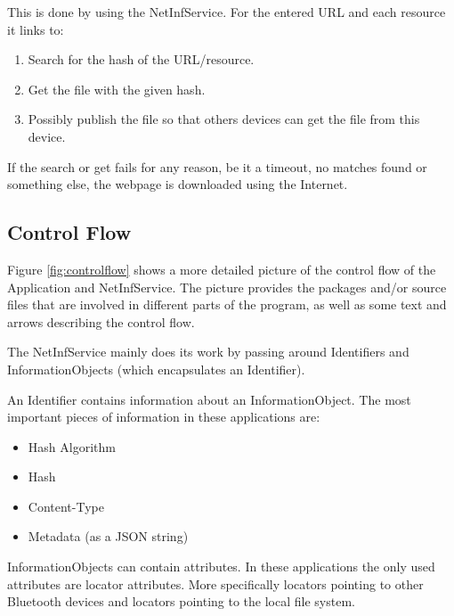 \documentclass[10pt,a4paper]{article}
\begin{document}
This is done by using the NetInfService. For the entered URL and each resource it links to:
\begin{enumerate}
	\item Search for the hash of the URL/resource.
	\item Get the file with the given hash.
	\item Possibly publish the file so that others devices can get the file from this device.
\end{enumerate}

If the search or get fails for any reason, be it a timeout, no matches found or something else, the webpage is downloaded using the Internet.

\subsection{Control Flow}

Figure \ref{fig:controlflow} shows a more detailed picture of the control flow of the Application and NetInfService. The picture provides the packages and/or source files that are involved in different parts of the program, as well as some text and arrows describing the control flow.

The NetInfService mainly does its work by passing around Identifiers and InformationObjects (which encapsulates an Identifier).

An Identifier contains information about an InformationObject. The most important pieces of information in these applications are:
\begin{itemize}
\item Hash Algorithm
\item Hash
\item Content-Type
\item Metadata (as a JSON string)
\end{itemize}

InformationObjects can contain attributes. In these applications the only used attributes are locator attributes. More specifically locators pointing to other Bluetooth devices and locators pointing to the local file system.
\end{document}
